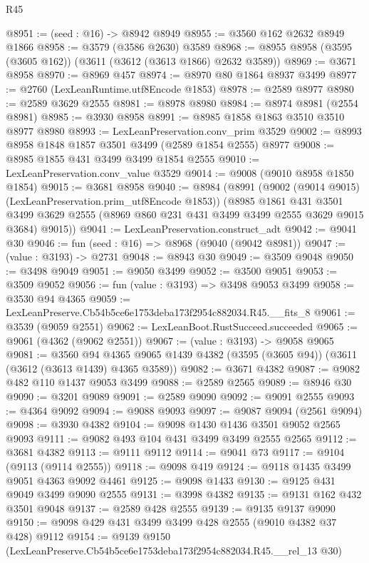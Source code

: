 \begin{lexlean}{R45}
\begin{coremodule}
@8951 := (seed : @16) -> @8942 @8949
@8955 := @3560 @162 @2632 @8949 @1866
@8958 := @3579 (@3586 @2630) @3589
@8968 := @8955 @8958 (@3595 (@3605 @162)) (@3611 (@3612 (@3613 @1866) @2632 @3589))
@8969 := @3671 @8958
@8970 := @8969 @457
@8974 := @8970 @80 @1864 @8937 @3499
@8977 := @2760 (LexLeanRuntime.utf8Encode @1853)
@8978 := @2589 @8977
@8980 := @2589 @3629 @2555
@8981 := @8978 @8980
@8984 := @8974 @8981 (@2554 @8981)
@8985 := @3930 @8958
@8991 := @8985 @1858 @1863 @3510 @3510 @8977 @8980
@8993 := LexLeanPreservation.conv_prim @3529
@9002 := @8993 @8958 @1848 @1857 @3501 @3499 (@2589 @1854 @2555) @8977
@9008 := @8985 @1855 @431 @3499 @3499 @1854 @2555
@9010 := LexLeanPreservation.conv_value @3529
@9014 := @9008 (@9010 @8958 @1850 @1854)
@9015 := @3681 @8958
@9040 := @8984
    (@8991
      (@9002 (@9014 @9015) (LexLeanPreservation.prim_utf8Encode @1853))
      (@8985
        @1861
        @431
        @3501
        @3499
        @3629
        @2555
        (@8969 @860 @231 @431 @3499 @3499 @2555 @3629 @9015 @3684)
        @9015))
@9041 := LexLeanPreservation.construct_adt
@9042 := @9041 @30
@9046 := fun (seed : @16) => @8968 (@9040 (@9042 @8981))
@9047 := (value : @3193) -> @2731
@9048 := @8943 @30
@9049 := @3509 @9048
@9050 := @3498 @9049
@9051 := @9050 @3499
@9052 := @3500 @9051
@9053 := @3509 @9052
@9056 := fun (value : @3193) => @3498 @9053 @3499
@9058 := @3530 @94 @4365
@9059 := LexLeanPreserve.Cb54b5ce6e1753deba173f2954c882034.R45.__fits_8
@9061 := @3539 (@9059 @2551)
@9062 := LexLeanBoot.RustSucceed.succeeded
@9065 := @9061 (@4362 (@9062 @2551))
@9067 := (value : @3193) -> @9058 @9065
@9081 := @3560
    @94
    @4365
    @9065
    @1439
    @4382
    (@3595 (@3605 @94))
    (@3611 (@3612 (@3613 @1439) @4365 @3589))
@9082 := @3671 @4382
@9087 := @9082 @482 @110 @1437 @9053 @3499
@9088 := @2589 @2565
@9089 := @8946 @30
@9090 := @3201 @9089
@9091 := @2589 @9090
@9092 := @9091 @2555
@9093 := @4364 @9092
@9094 := @9088 @9093
@9097 := @9087 @9094 (@2561 @9094)
@9098 := @3930 @4382
@9104 := @9098 @1430 @1436 @3501 @9052 @2565 @9093
@9111 := @9082 @493 @104 @431 @3499 @3499 @2555 @2565
@9112 := @3681 @4382
@9113 := @9111 @9112
@9114 := @9041 @73
@9117 := @9104 (@9113 (@9114 @2555))
@9118 := @9098 @419
@9124 := @9118 @1435 @3499 @9051 @4363 @9092 @4461
@9125 := @9098 @1433
@9130 := @9125 @431 @9049 @3499 @9090 @2555
@9131 := @3998 @4382
@9135 := @9131 @162 @432 @3501 @9048
@9137 := @2589 @428 @2555
@9139 := @9135 @9137 @9090
@9150 := @9098 @429 @431 @3499 @3499 @428 @2555 (@9010 @4382 @37 @428) @9112
@9154 := @9139 @9150 (LexLeanPreserve.Cb54b5ce6e1753deba173f2954c882034.R45.__rel_13 @30)

\end{coremodule}
\end{lexlean}
